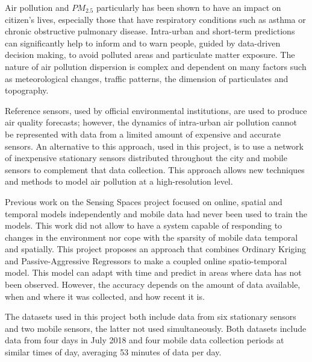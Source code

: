 Air pollution and $PM_{2.5}$ particularly has been shown to have an impact on citizen's lives, especially those that have respiratory conditions such as asthma or chronic obstructive pulmonary disease. Intra-urban and short-term predictions can significantly help to inform and to warn people, guided by data-driven decision making, to avoid polluted areas and particulate matter exposure. The nature of air pollution dispersion is complex and dependent on many factors such as meteorological changes, traffic patterns, the dimension of particulates and topography.

Reference sensors, used by official environmental institutions, are used to produce air quality forecasts; however, the dynamics of intra-urban air pollution cannot be represented with data from a limited amount of expensive and accurate sensors. An alternative to this approach, used in this project, is to use a network of inexpensive stationary sensors distributed throughout the city and mobile sensors to complement that data collection. This approach allows new techniques and methods to model air pollution at a high-resolution level.

Previous work on the Sensing Spaces project focused on online, spatial and temporal models independently and mobile data had never been used to train the models. This work did not allow to have a system capable of responding to changes in the environment nor cope with the sparsity of mobile data temporal and spatially. This project proposes an approach that combines Ordinary Kriging and Passive-Aggressive Regressors to make a coupled online spatio-temporal model. This model can adapt with time and predict in areas where data has not been observed. However, the accuracy depends on the amount of data available, when and where it was collected, and how recent it is.

The datasets used in this project both include data from six stationary sensors and two mobile sensors, the latter not used simultaneously. Both datasets include data from four days in July 2018 and four mobile data collection periods at similar times of day, averaging 53 minutes of data per day.

